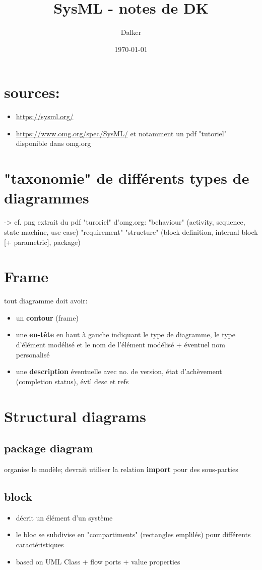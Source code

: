 \documentclass[11pt]{article}
\author{Dalker}
\date{\today}
\title{SysML - notes de DK}
\begin{document}
\maketitle
\tableofcontents

\section{sources:}
\label{sec:orge729a81}
\begin{itemize}
\item \url{https://sysml.org/}
\item \url{https://www.omg.org/spec/SysML/} et notamment un pdf "tutoriel" disponible dans omg.org
\end{itemize}
\section{"taxonomie" de différents types de diagrammes}
\label{sec:orgd52020e}
-> cf. png extrait du pdf "turoriel" d'omg.org:
 "behaviour" (activity, sequence, state machine, use case)
 "requirement"
 "structure" (block definition, internal block [+ parametric], package)
\section{Frame}
\label{sec:orgb345512}
tout diagramme doit avoir:
\begin{itemize}
\item un \textbf{contour} (frame)
\item une \textbf{en-tête} en haut à gauche indiquant le type de diagramme, le type
d'élément modélisé et le nom de l'élément modélisé + éventuel nom
personalisé
\item une \textbf{description} éventuelle avec no. de version, état d'achèvement
(completion status), évtl desc et refs
\end{itemize}
\section{Structural diagrams}
\label{sec:org47fb0cd}
\subsection{package diagram}
\label{sec:org001df6e}
organise le modèle; devrait utiliser la relation \textbf{import} pour des
sous-parties
\subsection{block}
\label{sec:org557980b}
\begin{itemize}
\item décrit un élément d'un système
\item le bloc se subdivise en "compartiments" (rectangles emplilés) pour différents
caractéristiques
\item based on UML Class + flow ports + value properties
\end{itemize}
\end{document}

